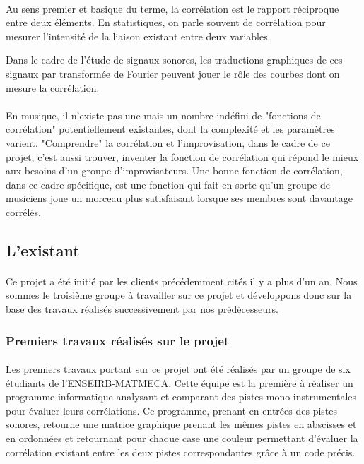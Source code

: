\paragraph{}
Au sens premier et basique du terme, la corrélation est le rapport
réciproque entre deux éléments. En statistiques, on parle souvent de
corrélation pour mesurer l'intensité de la liaison existant entre deux
variables.

 Dans le cadre de l'étude de signaux sonores, les
traductions graphiques de ces signaux par transformée de Fourier
peuvent jouer le rôle des courbes dont on mesure la corrélation.

\paragraph{}
En musique, il n'existe pas une mais un nombre indéfini de "fonctions
de corrélation" potentiellement existantes, dont la complexité et les
paramètres
varient. "Comprendre" la corrélation et l'improvisation,
dans le cadre de ce projet, c'est aussi trouver, inventer la fonction
de corrélation qui répond le mieux aux besoins d'un groupe
d'improvisateurs. Une bonne fonction de corrélation, dans ce cadre
spécifique, est une fonction qui fait en sorte qu'un groupe de
musiciens joue un morceau plus satisfaisant lorsque ses membres sont
davantage corrélés.

\subsection{L'existant}
\paragraph{}
Ce projet a été initié par les clients précédemment cités il y a plus
d'un an. Nous sommes le troisième groupe à travailler sur ce projet et
développons donc sur la base des travaux réalisés successivement par
nos prédécesseurs.

\subsubsection{Premiers travaux réalisés sur le projet}
\paragraph{}
Les premiers travaux portant sur ce projet ont été réalisés par un
groupe de six étudiants de l'ENSEIRB-MATMECA. Cette équipe est la
première à réaliser un programme informatique analysant et comparant
des pistes mono-instrumentales pour évaluer leurs corrélations. Ce
programme, prenant en entrées des pistes sonores, retourne une matrice
graphique prenant les mêmes pistes en abscisses et en ordonnées et
retournant pour chaque case une couleur permettant d'évaluer la
corrélation existant entre les deux pistes correspondantes grâce à un
code
précis.

